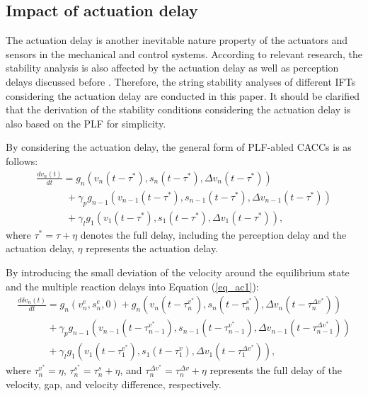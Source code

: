 \documentclass[journal]{IEEEtran}
\begin{document}
\subsection{Impact of actuation delay}

The actuation delay is another inevitable nature property of the actuators and sensors in the mechanical and control systems. According to relevant research, the stability analysis is also affected by the actuation delay as well as perception delays discussed before \citep{Xiao2008,Xiao2011,Wang2018}. Therefore, the string stability analyses of different IFTs considering the actuation delay are conducted in this paper. It should be clarified that the derivation of the stability conditions considering the actuation delay is also based on the PLF for simplicity.


By considering the actuation delay, the general form of PLF-abled CACCs is as follows:
\begin{equation}
  \begin{array}{l}
    \frac{{d{v_n}(t)}}{{dt}} = {g_n}\left( {{v_n}(t - {\tau ^*}),{s_n}(t - {\tau ^*}),\Delta {v_n}(t - {\tau ^*})} \right)                              \\
    \quad \quad \quad  + {\gamma _p}{g_{n - 1}}\left( {{v_{n - 1}}(t - {\tau ^*}),{s_{n - 1}}(t - {\tau ^*}),\Delta {v_{n - 1}}(t - {\tau ^*})} \right) \\
    \quad \quad \quad  + {\gamma _l}{g_1}\left( {{v_1}(t - {\tau ^*}),{s_1}(t - {\tau ^*}),\Delta {v_1}(t - {\tau ^*})} \right),
  \end{array}
  \label{eq_ac1}
\end{equation}
where ${\tau ^*} = \tau  + \eta $ denotes the full delay, including the perception delay and the actuation delay,  $\eta$ represents the actuation delay.

By introducing the small deviation of the velocity around the equilibrium state and the multiple reaction delays into Equation (\ref{eq_ac1}):
\begin{equation}
  \begin{array}{l}
    \frac{{d\delta {v_n}(t)}}{{dt}} = {g_n}\left( {v_n^e,s_n^e,0} \right) + {g_n}\left( {{v_n}(t - \tau _n^{{v^*}}),{s_n}\left( {t - \tau _n^{{s^*}}} \right),\Delta {v_n}\left( {t - \tau _n^{\Delta {v^*}}} \right)} \right)   \\
    \quad \quad \quad  + {\gamma _p}{g_{n - 1}}\left( {{v_{n - 1}}(t - \tau _{n - 1}^{{v^*}}),{s_{n - 1}}\left( {t - \tau _{n - 1}^{{v^*}}} \right),\Delta {v_{n - 1}}\left( {t - \tau _{n - 1}^{\Delta {v^*}}} \right)} \right) \\
    \quad \quad \quad  + {\gamma _l}{g_1}\left( {{v_1}(t - \tau _1^{{v^*}}),{s_1}\left( {t - \tau _1^v} \right),\Delta {v_1}\left( {t - \tau _1^{\Delta {v^*}}} \right)} \right),
  \end{array}
  \label{eq_ac2}
\end{equation}
where $\tau _n^{{v^*}} = \eta $, $\tau _n^{{s^*}} = \tau _n^s + \eta $, and $\tau _n^{\Delta {v^*}} = \tau _n^{\Delta v} + \eta $ represents the full delay of the velocity, gap, and velocity difference, respectively.
\end{document}
